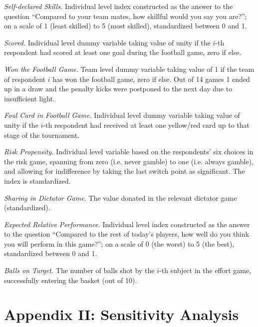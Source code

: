\textit{Self-declared Skills.} Individual level index constructed as the answer to the question ``Compared to your team mates, how skillful would you say you are?''; on a scale of 1 (least skilled) to 5 (most skilled), standardized between 0 and 1. 

\textit{Scored.} Individual level dummy variable taking value of unity if the $i$-th respondent had scored at least one goal during the football game, zero if else.

\textit{Won the Football Game.} Team level dummy variable taking value of 1 if the team of respondent $i$ has won the football game, zero if else. Out of 14 games 1 ended up in a draw and the penalty kicks were postponed to the next day due to insufficient light.

\textit{Foul Card in Football Game.} Individual level dummy variable taking value of unity if the $i$-th respondent had received at least one yellow/red card up to that stage of the tournament.

\textit{Risk Propensity.} Individual level variable based on the respondents’ six choices in the risk game, spanning from zero (i.e. never gamble) to one (i.e. always gamble), and allowing for indifference by taking the last switch point as significant. The index is standardized.

\textit{Sharing in Dictator Game.} The value donated in the relevant dictator game (standardized).

\textit{Expected Relative Performance.} Individual level index constructed as the answer to the question ``Compared to the rest of today’s players, how well do you think you will perform in this game?''; on a scale of 0 (the worst) to 5 (the best), standardized between 0 and 1. 

\textit{Balls on Target.} The number of balls shot by the $i$-th subject in the effort game, successfully entering the basket (out of 10).

\clearpage
\section{Appendix II: Sensitivity Analysis}
\setcounter{table}{0}
\renewcommand{\thetable}{\arabic{chapter}.A\arabic{table}}

